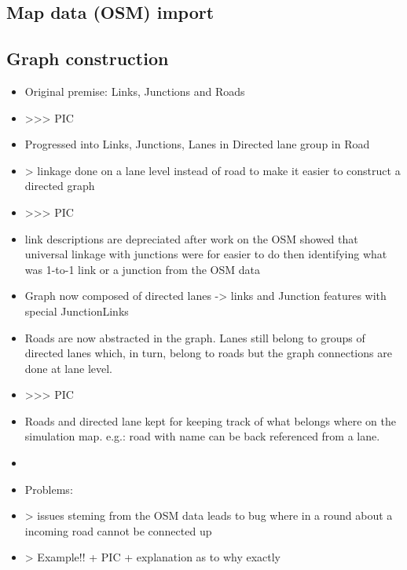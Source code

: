 \subsection{Map data (OSM) import}


\subsection{Graph construction}

\begin{itemize}
	\item Original premise: Links, Junctions and Roads
	\item >>> PIC
	\item Progressed into Links, Junctions, Lanes in Directed lane group in Road
	\item > linkage done on a lane level instead of road to make it easier to construct a directed graph
	\item >>> PIC
	\item link descriptions are depreciated after work on the OSM showed that universal linkage with junctions were for easier to do then identifying what was 1-to-1 link or a junction from the OSM data
	\item Graph now composed of directed lanes -> links and Junction features with special JunctionLinks
	\item Roads are now abstracted in the graph. Lanes still belong to groups of directed lanes which, in turn, belong to roads but the graph connections are done at lane level.
	\item >>> PIC
	\item Roads and directed lane kept for keeping track of what belongs where on the simulation map. e.g.: road with name can be back referenced from a lane.
	\item 
\end{itemize}

\begin{itemize}
	\item Problems:
	\item > issues steming from the OSM data leads to bug where in a round about a incoming road cannot be connected up
	\item > Example!! + PIC + explanation as to why exactly
\end{itemize}

